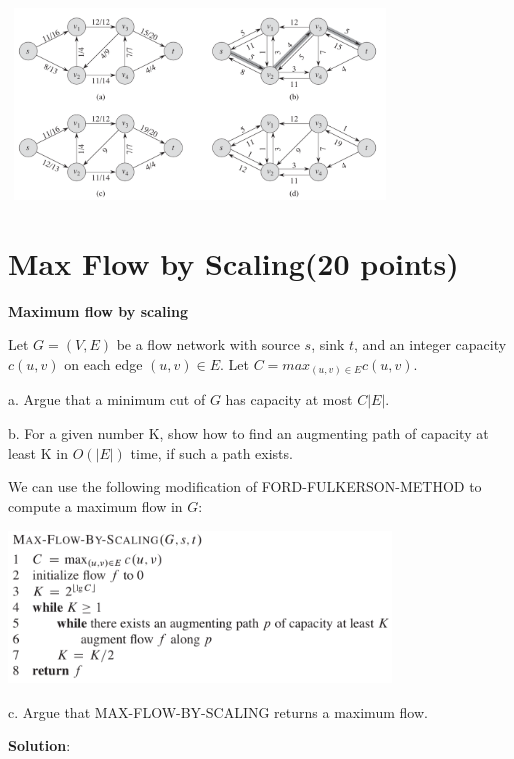 \documentclass{article}
\begin{document}
\begin{center} %
\includegraphics[width=4.00in,height=2.00in]{hw5_2.png}
\end{center}


\section{Max Flow by Scaling(20 points)}
\textbf{Maximum flow by scaling}

Let $G=(V, E)$ be a flow network with source $s$, sink $t$, and an integer capacity $c(u, v)$ on each edge $(u, v)\in{E}$. Let $C=max_{(u,v)\in{E}}c(u,v)$.

a. Argue that a minimum cut of $G$ has capacity at most $C|E|$.

b. For a given number K, show how to find an augmenting path of capacity at least K in $O(|E|)$ time, if such a path exists.

We can use the following modification of FORD-FULKERSON-METHOD to compute a maximum flow in $G$:

\begin{center} %
\includegraphics[width=4.00in,height=1.60in]{hw5_1.png}
\end{center}


c. Argue that MAX-FLOW-BY-SCALING returns a maximum flow.\newline

\textbf{Solution}:
\end{document}
